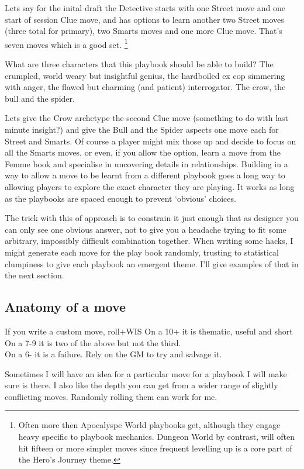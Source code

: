 \documentclass{tufte-handout}
\begin{document}
Lets say for the inital draft the Detective starts with one Street move and one start of session Clue move, and has options to learn another two Street moves (three total for primary), two Smarts moves and one more Clue move. That's seven moves which is a good set. \footnote{ Often more then Apocalyspe World playbooks get, although they engage heavy specific to playbook mechanics. Dungeon World by contrast, will often hit fifteen or more simpler moves since frequent levelling up is a core part of the Hero's Journey theme.}

What are three characters that this playbook should be able to build? The crumpled, world weary but insightful genius, the hardboiled ex cop simmering with anger, the flawed but charming (and patient) interrogator. The crow, the bull and the spider.

Lets give the Crow archetype the second Clue move (something to do with last minute insight?) and give the Bull and the Spider aspects one move each for Street and Smarts. Of course a player might mix those up and decide to focus on all the Smarts moves, or even, if you allow the option, learn a move from the Femme book and specialise in uncovering details in relationships. Building in a way to allow a move to be learnt from a different playbook goes a long way to allowing players to explore the exact character they are playing. It works as long as the playbooks are spaced enough to prevent `obvious' choices.
 
The trick with this of approach is to constrain it just enough that as designer you can only see one obvious answer, not to give you a headache trying to fit some arbitrary, impossibly difficult combination together. 
When writing some hacks, I might generate each move for the play book randomly, trusting to statistical clumpiness to give each playbook an emergent theme. I'll give examples of that in the next section.
 
 \subsection{Anatomy of a move}
If you write a custom move, roll+WIS
On a 10+ it is thematic, useful and short \\
On a 7-9  it is two of the above but not the third.\\
On a 6- it is a failure. Rely on the GM to try and salvage it.

Sometimes I will have an idea for a particular move for a playbook I will make sure is there. I also like the depth you can get from a wider range of slightly conflicting moves. Randomly rolling them can work for me.
\end{document}
